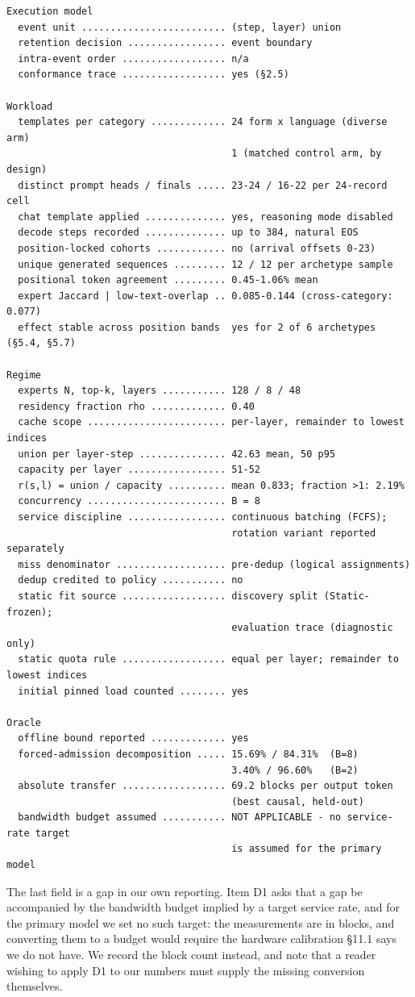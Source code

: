 \documentclass[
  10pt,
  letterpaper,
  10pt]{article}
\begin{document}
\begin{verbatim}
Execution model
  event unit ......................... (step, layer) union
  retention decision ................. event boundary
  intra-event order .................. n/a
  conformance trace .................. yes (§2.5)

Workload
  templates per category ............. 24 form x language (diverse arm)
                                       1 (matched control arm, by design)
  distinct prompt heads / finals ..... 23-24 / 16-22 per 24-record cell
  chat template applied .............. yes, reasoning mode disabled
  decode steps recorded .............. up to 384, natural EOS
  position-locked cohorts ............ no (arrival offsets 0-23)
  unique generated sequences ......... 12 / 12 per archetype sample
  positional token agreement ......... 0.45-1.06% mean
  expert Jaccard | low-text-overlap .. 0.085-0.144 (cross-category: 0.077)
  effect stable across position bands  yes for 2 of 6 archetypes (§5.4, §5.7)

Regime
  experts N, top-k, layers ........... 128 / 8 / 48
  residency fraction rho ............. 0.40
  cache scope ........................ per-layer, remainder to lowest indices
  union per layer-step ............... 42.63 mean, 50 p95
  capacity per layer ................. 51-52
  r(s,l) = union / capacity .......... mean 0.833; fraction >1: 2.19%
  concurrency ........................ B = 8
  service discipline ................. continuous batching (FCFS);
                                       rotation variant reported separately
  miss denominator ................... pre-dedup (logical assignments)
  dedup credited to policy ........... no
  static fit source .................. discovery split (Static-frozen);
                                       evaluation trace (diagnostic only)
  static quota rule .................. equal per layer; remainder to lowest indices
  initial pinned load counted ........ yes

Oracle
  offline bound reported ............. yes
  forced-admission decomposition ..... 15.69% / 84.31%  (B=8)
                                       3.40% / 96.60%   (B=2)
  absolute transfer .................. 69.2 blocks per output token
                                       (best causal, held-out)
  bandwidth budget assumed ........... NOT APPLICABLE - no service-rate target
                                       is assumed for the primary model
\end{verbatim}

The last field is a gap in our own reporting. Item D1 asks that a gap be
accompanied by the bandwidth budget implied by a target service rate,
and for the primary model we set no such target: the measurements are in
blocks, and converting them to a budget would require the hardware
calibration §11.1 says we do not have. We record the block count
instead, and note that a reader wishing to apply D1 to our numbers must
supply the missing conversion themselves.
\end{document}
